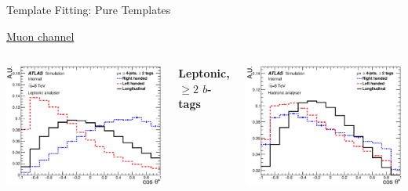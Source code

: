 \documentclass{beamer}
\begin{document}
{\begin{frame}[noframenumbering]{Template Fitting: Pure Templates}
{\begin{itemize}
      \end{itemize}
      \centering\small\underline{Muon channel}
      \vspace{-20pt}
      \begin{columns}
        \begin{center}\includegraphics[width=1.16\textwidth]{../chapters/whel/figures/templatePlots/Leptonic/Signal_Templates_2incl_mu_lep}\end{center}\vspace{-15pt}\centering\tiny
        \textbf{Leptonic, $\geq2$ $b$-tags}
        \begin{center}\includegraphics[width=1.16\textwidth]{../chapters/whel/figures/templatePlots/Hadronic/Signal_Templates_2incl_mu_had}\end{center}\vspace{-15pt}\centering\tiny

\end{columns}}
\end{frame}}
\end{document}
